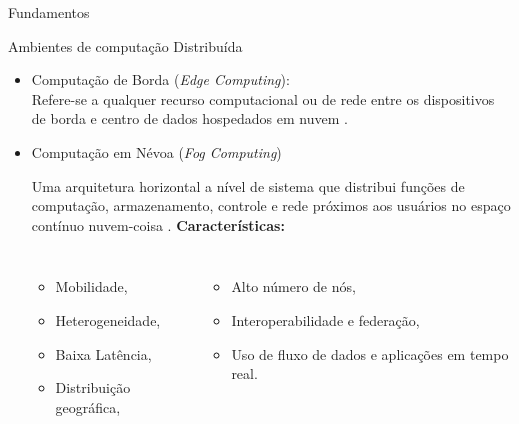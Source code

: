 \documentclass[aspectratio=1610,10pt]{beamer}
\begin{document}
\begin{frame}[fragile]{Fundamentos}
\begin{alertblock}{Ambientes de computação Distribuída}
\begin{itemize}
  \item Computação de Borda (\emph{Edge Computing}):
  \\ Refere-se a qualquer recurso computacional ou de rede entre os dispositivos
  de borda e centro de dados hospedados em nuvem \cite{Shi2016}.

  \item Computação em Névoa (\emph{Fog Computing})
  
  
  
  Uma arquitetura horizontal a nível de sistema que distribui funções de
  computação, armazenamento, controle e rede próximos aos usuários no espaço
  contínuo nuvem-coisa \cite{IEEECommunicationsSociety2018}.
  \textbf{Características:}
  \begin{columns}
    \begin{itemize}
      \item Mobilidade,
      \item Heterogeneidade,
      \item Baixa Latência,
      \item Distribuição geográfica,
    \end{itemize}
    \begin{itemize}
      \item Alto número de nós,
      \item Interoperabilidade e federação,
      \item Uso de fluxo de dados e aplicações em tempo real.
    \end{itemize}
  \end{columns}
\end{itemize}
\end{alertblock}
\end{frame}
\end{document}
